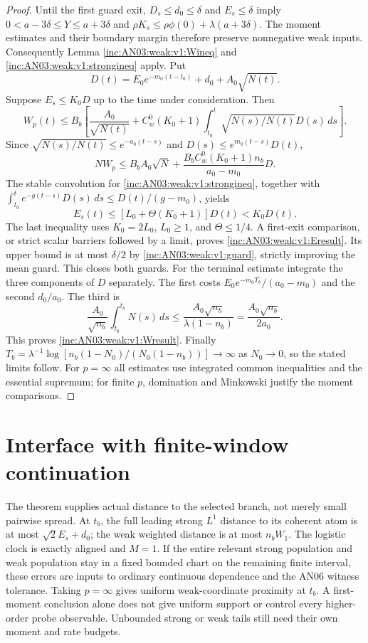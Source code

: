 \documentclass[11pt]{article}
\numberwithin{equation}{section}
\theoremstyle{remark}\newtheorem{remark}[theorem]{Remark}
\newcommand{\dd}{\,d}\newcommand{\E}{\mathbb E}\newcommand{\R}{\mathbb R}
\begin{document}
\begin{proof}
Until the first guard exit, $D_s\le d_0\le\delta$ and $E_s\le\delta$ imply
$0<a-3\delta\le Y\le a+3\delta$ and $\rho K_s\le\rho\phi(0)+\lambda(a+3\delta)$. The moment estimates and their boundary margin therefore preserve nonnegative weak inputs. Consequently Lemma \ref{inc:AN03:weak:v1:Wineq} and \eqref{inc:AN03:weak:v1:strongineq} apply.
Put
\[
 D(t)=E_0e^{-m_0(t-t_0)}+d_0+A_0\sqrt{N(t)}.
\]
Suppose $E_s\le K_0D$ up to the time under consideration. Then
\[
 W_p(t)\le B_b\left[\frac{A_0}{\sqrt{N(t)}}
       +C_w^0(K_0+1)\int_{t_0}^t\sqrt{N(s)/N(t)}D(s)\dd s\right].
\]
Since $\sqrt{N(s)/N(t)}\le e^{-a_0(t-s)}$ and $D(s)\le e^{m_0(t-s)}D(t)$,
\[
 NW_p\le B_b A_0\sqrt N+
 \frac{B_bC_w^0(K_0+1)n_b}{a_0-m_0}D.
\]
The stable convolution for \eqref{inc:AN03:weak:v1:strongineq}, together with $\int_{t_0}^te^{-g(t-s)}D(s)\dd s\le D(t)/(g-m_0)$, yields
\[
 E_s(t)\le[L_0+\Theta(K_0+1)]D(t)<K_0D(t).
\]
The last inequality uses $K_0=2L_0$, $L_0\ge1$, and $\Theta\le1/4$. A first-exit comparison, or strict scalar barriers followed by a limit, proves \eqref{inc:AN03:weak:v1:Eresult}. Its upper bound is at most $\delta/2$ by \eqref{inc:AN03:weak:v1:guard}, strictly improving the mean guard. This closes both guards.
For the terminal estimate integrate the three components of $D$ separately. The first costs $E_0e^{-m_0T_b}/(a_0-m_0)$ and the second $d_0/a_0$. The third is
\[
 \frac{A_0}{\sqrt{n_b}}\int_{t_0}^{t_b}N(s)\dd s
 \le\frac{A_0\sqrt{n_b}}{\lambda(1-n_b)}
 =\frac{A_0\sqrt{n_b}}{2a_0}.
\]
This proves \eqref{inc:AN03:weak:v1:Wresult}. Finally
$T_b=\lambda^{-1}\log[n_b(1-N_0)/(N_0(1-n_b))]\to\infty$ as $N_0\to0$, so the stated limits follow. For $p=\infty$ all estimates use integrated common inequalities and the essential supremum; for finite $p$, domination and Minkowski justify the moment comparisons.
\end{proof}

\section{Interface with finite-window continuation}
The theorem supplies actual distance to the selected branch, not merely small pairwise spread. At $t_b$, the full leading strong $L^1$ distance to its coherent atom is at most $\sqrt2E_s+d_0$; the weak weighted distance is at most $n_bW_1$. The logistic clock is exactly aligned and $M=1$.
If the entire relevant strong population and weak population stay in a fixed bounded chart on the remaining finite interval, these errors are inputs to ordinary continuous dependence and the AN06 witness tolerance. Taking $p=\infty$ gives uniform weak-coordinate proximity at $t_b$. A first-moment conclusion alone does not give uniform support or control every higher-order probe observable. Unbounded strong or weak tails still need their own moment and rate budgets.
\end{document}
